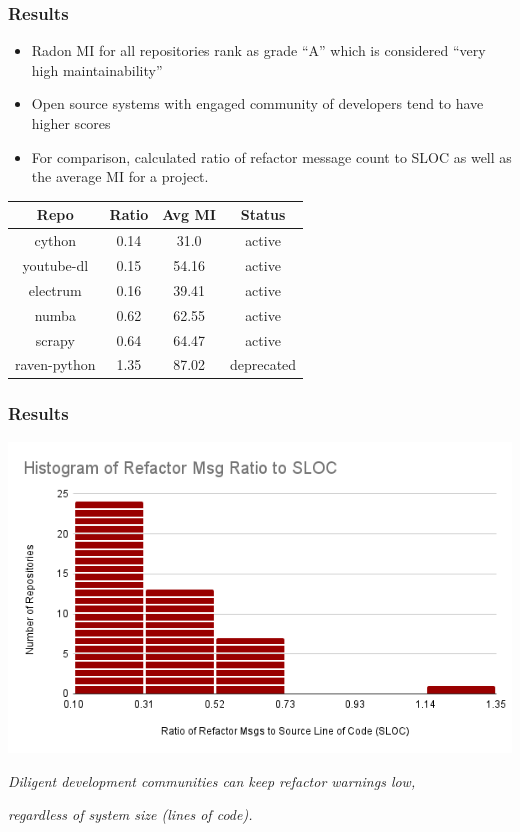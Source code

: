 \documentclass{beamer}
\begin{document}
\begin{frame}
  \frametitle{Results}
  \begin{itemize}
    \item Radon MI for all repositories rank as grade ``A''
    \newline which is considered ``very high maintainability''
    \item Open source systems with engaged community 
    \newline of developers tend to have higher scores
    \item For comparison, calculated ratio of refactor message count 
    \newline to SLOC as well as the average MI for a project.
  \end{itemize}

  \vspace{0.25cm}
  \begin{center}
    \begin{tabular}{ c c c c }
      \textbf{Repo} & \textbf{Ratio} & \textbf{Avg MI} & \textbf{Status} \\ 
      \hline\hline
      cython & 0.14 & 31.0 & active \\ \hline  %
      youtube-dl & 0.15 & 54.16 & active \\ \hline  %
      electrum & 0.16 & 39.41 & active \\ \hline  %
      \hline
      numba & 0.62 & 62.55 & active \\ \hline  %
      scrapy & 0.64 & 64.47 & active \\ \hline  %
      raven-python & 1.35 & 87.02 & deprecated \\ \hline  %
    \end{tabular}
  \end{center}
\end{frame}

\begin{frame}
  \frametitle{Results}
  \begin{center}
    \includegraphics[width=0.8\columnwidth]{Histogram of Refactor Msg Ratio to SLOC.png}
  \end{center}
  \begin{center}
    {\small \emph{Diligent development communities can keep refactor warnings low,}}
    
    {\small \emph{regardless of system size (lines of code).}}
  \end{center}
\end{frame}
\end{document}
